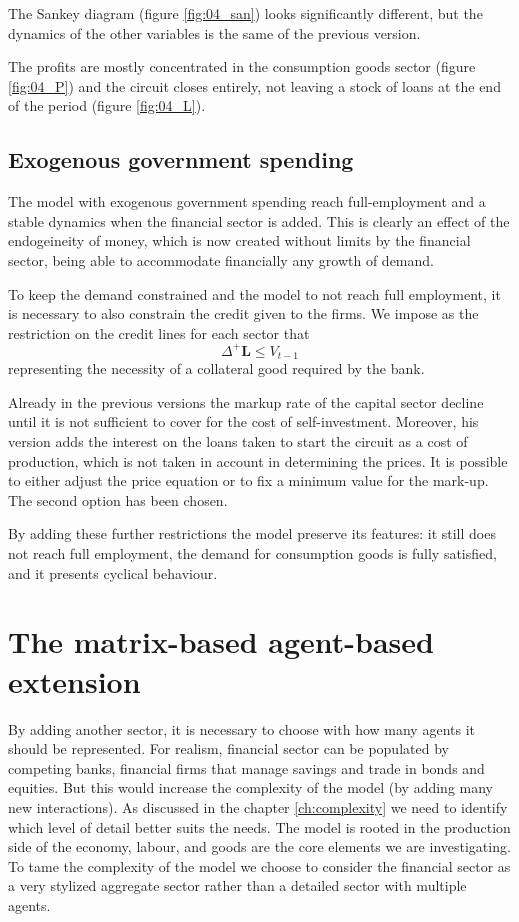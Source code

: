 The Sankey diagram (figure \ref{fig:04_san}) looks significantly different, but the dynamics of the other variables is the same of the previous version.

The profits are mostly concentrated in the consumption goods sector (figure \ref{fig:04_P}) and the circuit closes entirely, not leaving a stock of loans at the end of the period (figure \ref{fig:04_L}).

\subsection{Exogenous government spending}
The model with exogenous government spending reach full-employment and a stable dynamics when the financial sector is added.
This is clearly an effect of the endogeineity of money, which is now created without limits by the financial sector, being able to accommodate financially any growth of demand.

To keep the demand constrained and the model to not reach full employment, it is necessary to also constrain the credit given to the firms.
We impose as the restriction on the credit lines for each sector that $$\Delta^+\mathbf{L} \le V_{t-1}$$ representing the necessity of a collateral good required by the bank.

Already in the previous versions the markup rate of the capital sector decline until it is not sufficient to cover for the cost of self-investment.
Moreover, his version adds the interest on the loans taken to start the circuit as a cost of production, which is not taken in account in determining the prices.
It is possible to either adjust the price equation or to fix a minimum value for the mark-up. The second option has been chosen.

By adding these further restrictions the model preserve its features: it still does not reach full employment, the demand for consumption goods is fully satisfied, and it presents cyclical behaviour.

\section{The matrix-based agent-based extension}
By adding another sector, it is necessary to choose with how many agents it should be represented.
For realism, financial sector can be populated by competing banks, financial firms that manage savings and trade in bonds and equities.
But this would increase the complexity of the model (by adding many new interactions).
As discussed in the chapter \ref{ch:complexity} we need to identify which level of detail better suits the needs.
The model is rooted in the production side of the economy, labour, and goods are the core elements we are investigating.
To tame the complexity of the model we choose to consider the financial sector as a very stylized aggregate sector rather than a detailed sector with multiple agents.

